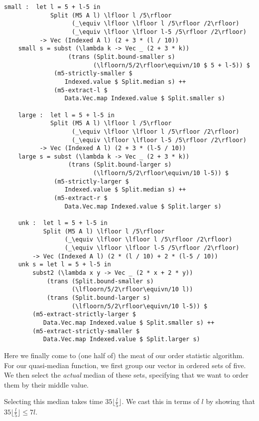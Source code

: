 \begin{lstlisting}[caption={Quasi-Median},label={lst:median:quasimedian}]
    small :  let l = 5 + l-5 in
             Split (M5 A l) \lfloor l /5\rfloor
                   (_\equiv \lfloor \lfloor l /5\rfloor /2\rfloor)
                   (_\equiv \lfloor \lfloor l-5 /5\rfloor /2\rfloor)
          -> Vec (Indexed A l) (2 + 3 * (l / 10))
    small s = subst (\lambda k -> Vec _ (2 + 3 * k))
                  (trans (Split.bound-smaller s)
                         (\lfloorn/5/2\rfloor\equivn/10 $ 5 + l-5)) $
              (m5-strictly-smaller $
                 Indexed.value $ Split.median s) ++
              (m5-extract-l $
                 Data.Vec.map Indexed.value $ Split.smaller s)

    large :  let l = 5 + l-5 in
             Split (M5 A l) \lfloor l /5\rfloor
                   (_\equiv \lfloor \lfloor l /5\rfloor /2\rfloor)
                   (_\equiv \lfloor \lfloor l-5 /5\rfloor /2\rfloor)
          -> Vec (Indexed A l) (2 + 3 * (l-5 / 10))
    large s = subst (\lambda k -> Vec _ (2 + 3 * k))
                  (trans (Split.bound-larger s)
                         (\lfloorn/5/2\rfloor\equivn/10 l-5)) $
              (m5-strictly-larger $
                 Indexed.value $ Split.median s) ++
              (m5-extract-r $
                 Data.Vec.map Indexed.value $ Split.larger s)

    unk :  let l = 5 + l-5 in
           Split (M5 A l) \lfloor l /5\rfloor
                 (_\equiv \lfloor \lfloor l /5\rfloor /2\rfloor)
                 (_\equiv \lfloor \lfloor l-5 /5\rfloor /2\rfloor)
        -> Vec (Indexed A l) (2 * (l / 10) + 2 * (l-5 / 10))
    unk s = let l = 5 + l-5 in
        subst2 (\lambda x y -> Vec _ (2 * x + 2 * y))
            (trans (Split.bound-smaller s)
                   (\lfloorn/5/2\rfloor\equivn/10 l))
            (trans (Split.bound-larger s)
                   (\lfloorn/5/2\rfloor\equivn/10 l-5)) $
        (m5-extract-strictly-larger $
           Data.Vec.map Indexed.value $ Split.smaller s) ++
        (m5-extract-strictly-smaller $
           Data.Vec.map Indexed.value $ Split.larger s)
\end{lstlisting}

Here we finally come to (one half of) the meat of our order statistic algorithm. For our quasi-median function, we first group our vector in ordered sets of five. We then select the \emph{actual} median of these sets, specifying that we want to order them by their middle value.

Selecting this median takes time $35 \lfloor \frac l 5 \rfloor$. We cast this in terms of $l$ by showing that $35 \lfloor \frac l 5 \rfloor \leq 7 l$.

